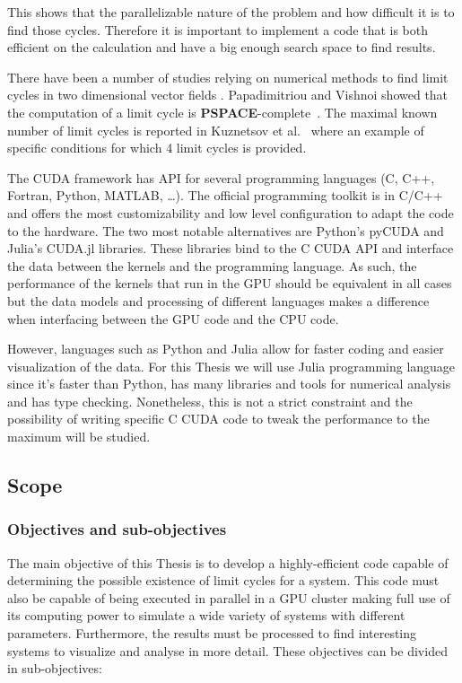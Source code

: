 This shows that the parallelizable nature of the problem and how difficult it is
to find those cycles. Therefore it is important to implement a code that is both
efficient on the calculation and have a big enough search space to find results.

There have been a number of studies relying on numerical methods to find limit
cycles in two dimensional vector fields
\cite{leonov_hidden_2013,van_der_hoff_numerical_2013,casades_computation_2013,gasull_effective_nodate}.
Papadimitriou and Vishnoi showed that the computation of a limit cycle is
\textbf{PSPACE}-complete~\cite{papadimitriou_computational_2015}.
The maximal known number of limit cycles is reported in Kuznetsov et
al.~\cite{kuznetsov_visualization_2013} where an example of specific conditions
for which 4 limit cycles is provided.

The CUDA framework has API for several programming languages (C, C++, Fortran,
Python, MATLAB, \dots). The official programming toolkit is in C/C++ and offers
the most customizability and low level configuration to adapt the code to the
hardware. The two most notable alternatives are Python's pyCUDA and Julia's
CUDA.jl libraries. These libraries bind to the C CUDA API and interface the data
between the kernels and the programming language. As such, the performance of
the kernels that run in the GPU should be equivalent in all cases but the data
models and processing of different languages makes a difference when interfacing
between the GPU code and the CPU code.

However, languages such as Python and Julia allow for faster coding and easier
visualization of the data. For this Thesis we will use Julia programming
language since it's faster than Python, has many libraries and tools for
numerical analysis and has type checking.  Nonetheless, this is not a strict
constraint and the possibility of writing specific C CUDA code to tweak the
performance to the maximum will be studied.

\pagebreak
\subsection{Scope}
\subsubsection{Objectives and sub-objectives}

The main objective of this Thesis is to develop a highly-efficient code capable
of determining the possible existence of limit cycles for a system. This code
must also be capable of being executed in parallel in a GPU cluster making full
use of its computing power to simulate a wide variety of systems with different
parameters. Furthermore, the results must be processed to find interesting
systems to visualize and analyse in more detail. These objectives can be divided
in sub-objectives:

